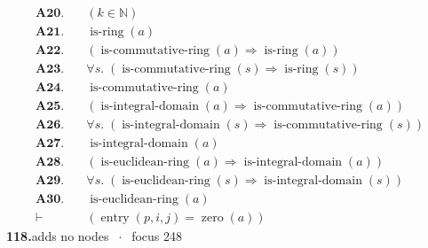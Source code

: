 \documentclass[11pt]{article}
\theoremstyle{plain}
\newcommand{\fit}[1]{\resizebox{\ifdim\width>\linewidth\linewidth\else\width\fi}{!}{#1}}
\begin{document}
\begin{align*}
  \mathbf{A20.}\quad & (k \in \mathbb{N}) \\
  \mathbf{A21.}\quad & \operatorname{is\text{-}ring}(a) \\
  \mathbf{A22.}\quad & (\operatorname{is\text{-}commutative\text{-}ring}(a) \Rightarrow \operatorname{is\text{-}ring}(a)) \\
  \mathbf{A23.}\quad & \forall s.\; (\operatorname{is\text{-}commutative\text{-}ring}(s) \Rightarrow \operatorname{is\text{-}ring}(s)) \\
  \mathbf{A24.}\quad & \operatorname{is\text{-}commutative\text{-}ring}(a) \\
  \mathbf{A25.}\quad & (\operatorname{is\text{-}integral\text{-}domain}(a) \Rightarrow \operatorname{is\text{-}commutative\text{-}ring}(a)) \\
  \mathbf{A26.}\quad & \forall s.\; (\operatorname{is\text{-}integral\text{-}domain}(s) \Rightarrow \operatorname{is\text{-}commutative\text{-}ring}(s)) \\
  \mathbf{A27.}\quad & \operatorname{is\text{-}integral\text{-}domain}(a) \\
  \mathbf{A28.}\quad & (\operatorname{is\text{-}euclidean\text{-}ring}(a) \Rightarrow \operatorname{is\text{-}integral\text{-}domain}(a)) \\
  \mathbf{A29.}\quad & \forall s.\; (\operatorname{is\text{-}euclidean\text{-}ring}(s) \Rightarrow \operatorname{is\text{-}integral\text{-}domain}(s)) \\
  \mathbf{A30.}\quad & \operatorname{is\text{-}euclidean\text{-}ring}(a) \\
  \vdash\quad & (\operatorname{entry}(p, i, j) = \operatorname{zero}(a))
\end{align*}
\medskip\noindent\textbf{118.}\quad \fit{\texttt{(ass)}}\hfill{\small adds no nodes $\;\cdot\;$ focus 248}\\[2pt]
\end{document}
